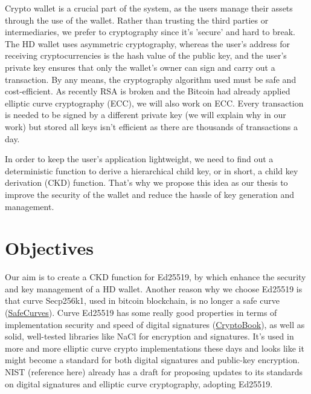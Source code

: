 Crypto wallet is a crucial part of the system, as the users manage their assets through the use of the wallet. Rather than trusting the third parties or intermediaries, we prefer to cryptography since it's 'secure' and hard to break. The HD wallet uses asymmetric cryptography, whereas the user's address for receiving cryptocurrencies is the hash value of the public key, and the user's private key ensures that only the wallet's owner can sign and carry out a transaction. By any means, the cryptography algorithm used must be safe and cost-efficient. As recently RSA is broken and the Bitcoin had already applied elliptic curve cryptography (ECC), we will also work on ECC. Every transaction is needed to be signed by a different private key (we will explain why in our work) but stored all keys isn't efficient as there are thousands of transactions a day.

In order to keep the user's application lightweight, we need to find out a deterministic function to derive a hierarchical child key, or in short, a child key derivation (CKD) function. That's why we propose this idea as our thesis to improve the security of the wallet and reduce the hassle of key generation and management.

\section{Objectives}


Our aim is to create a CKD function for Ed25519, by which enhance the security and key management of a HD wallet. Another reason why we choose Ed25519 is that curve Secp256k1, used in bitcoin blockchain, is no longer a safe curve (\href{http://safecurves.cr.yp.to/disc.html}{SafeCurves}). Curve Ed25519 has some really good properties in terms of implementation security and speed of digital signatures (\href{https://cryptobook.nakov.com/digital-signatures/eddsa-and-ed25519}{CryptoBook}), as well as solid, well-tested libraries like NaCl for encryption and signatures. It's used in more and more elliptic curve crypto implementations these days and looks like it might become a standard for both digital signatures and public-key encryption. NIST (reference here) already has a draft for proposing updates to its standards on digital signatures and elliptic curve cryptography, adopting Ed25519.

